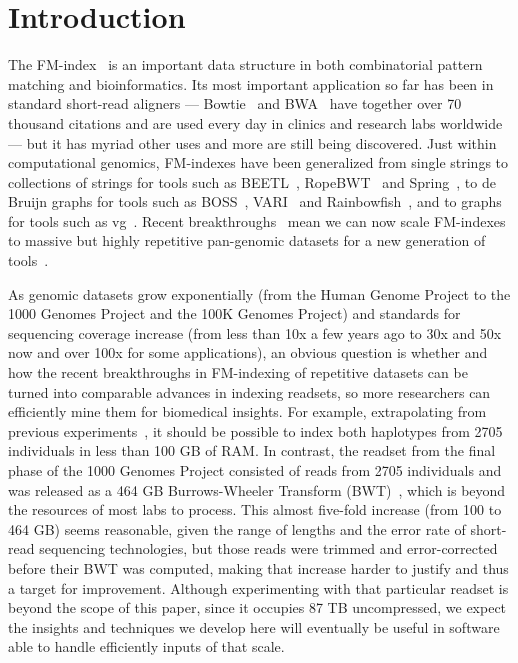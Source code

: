 \section{Introduction}
\label{xbwt:sec:introduction}

The FM-index~\cite{ferragina2005indexing} is an important data structure in both combinatorial pattern matching and bioinformatics.  Its most important application so far has been in standard short-read aligners --- Bowtie~\cite{langmead2009ultrafast,langmead2012fast} and BWA~\cite{li2009fast} have together over 70 thousand citations and are used every day in clinics and research labs worldwide --- but it has myriad other uses and more are still being discovered.  Just within computational genomics, FM-indexes have been generalized from single strings to collections of strings for tools such as BEETL~\cite{Beetl}, RopeBWT~\cite{ropebwt2} and Spring~\cite{spring}, to de Bruijn graphs for tools such as BOSS~\cite{BOSS}, VARI~\cite{muggli2017succinct} and Rainbowfish~\cite{almodaresi2017rainbowfish}, and to graphs for tools such as vg~\cite{garrison2018variation}. Recent breakthroughs~\cite{gagie2020fully} mean we can now scale FM-indexes to massive but highly repetitive pan-genomic datasets for a new generation of tools~\cite{kuhnle2020efficient}.

As genomic datasets grow exponentially (from the Human Genome Project to the 1000 Genomes Project and the 100K Genomes Project) and standards for sequencing coverage increase (from less than 10x a few years ago to 30x and 50x now and over 100x for some applications), an obvious question is whether and how the recent breakthroughs in FM-indexing of repetitive datasets can be turned into comparable advances in indexing readsets, so more researchers can efficiently mine them for biomedical insights. For example, extrapolating from previous experiments~\cite{kuhnle2020efficient}, it should be possible to index both haplotypes from  2705 individuals in less than 100 GB of RAM.  In contrast, the readset from the final phase of the 1000 Genomes Project consisted of reads from 2705 individuals and was released as a 464 GB Burrows-Wheeler Transform (BWT)~\cite{dolle2017using}, which is beyond the resources of most labs to process.
This almost five-fold increase (from 100 to 464 GB) seems reasonable, given the range of lengths and the error rate of short-read sequencing technologies, but those reads were trimmed and error-corrected before their BWT was computed, making that increase harder to justify and thus a target for improvement.  Although experimenting with that particular readset is beyond the scope of this paper, since it occupies 87 TB uncompressed, we expect the insights and techniques we develop here will eventually be useful in software able to handle efficiently inputs of that scale.

